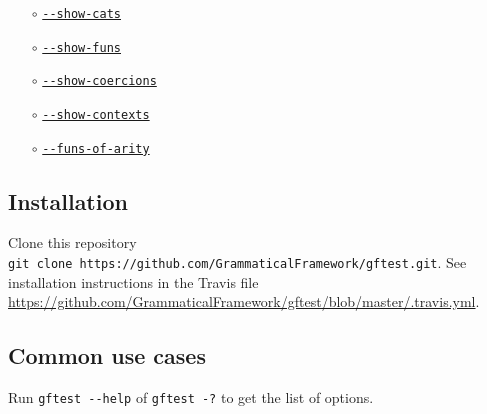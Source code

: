 \begin{itemize}
  \begin{itemize}
  \tightlist
  \item[$\circ$]
    \protect\hyperlink{show-cats}{\texttt{-\/-show-cats}}
  \item[$\circ$]
    \protect\hyperlink{show-funs}{\texttt{-\/-show-funs}}
  \item[$\circ$]
    \protect\hyperlink{show-coercions}{\texttt{-\/-show-coercions}}
  \item[$\circ$]
    \protect\hyperlink{show-contexts}{\texttt{-\/-show-contexts}}
  \item[$\circ$]
    \protect\hyperlink{funs-of-arity}{\texttt{-\/-funs-of-arity}}
  \end{itemize}
\end{itemize}

\hypertarget{installation}{%
\subsection{Installation}\label{installation}}


Clone this repository
\texttt{git\ clone\ https://github.com/GrammaticalFramework/gftest.git}.
See installation instructions in the Travis file \url{https://github.com/GrammaticalFramework/gftest/blob/master/.travis.yml}.


\hypertarget{common-use-cases}{%
\subsection{Common use cases}\label{common-use-cases}}

Run \texttt{gftest\ -\/-help} of \texttt{gftest\ -?} to get the list of
options.

